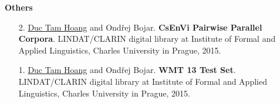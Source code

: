 \documentclass[9pt]{extreport}
\begin{document}
			\textbf{Others}
			\begin{enumerate}
				
				\item[2.] \underline{Duc Tam Hoang} and  Ond\v{r}ej Bojar. \textbf{CsEnVi Pairwise Parallel Corpora}. LINDAT/CLARIN digital library at Institute of Formal and Applied Linguistics, Charles University in Prague, 2015.
				
				\item[1.] \underline{Duc Tam Hoang} and  Ond\v{r}ej Bojar. \textbf{WMT 13 Test Set}. LINDAT/CLARIN digital library at Institute of Formal and Applied Linguistics, Charles University in Prague, 2015.
			\end{enumerate}
			
			
			
			
			
		
\end{document}

